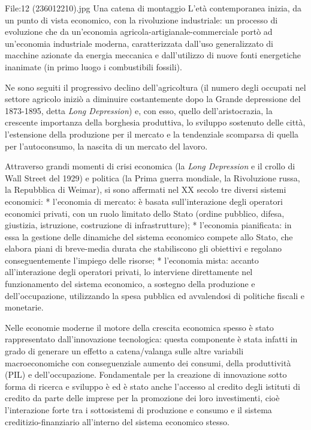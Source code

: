 File:12 (236012210).jpg Una catena di montaggio
L'età contemporanea inizia, da un punto di vista 
economico, con la rivoluzione industriale: un processo di evoluzione che da 
un'economia 
agricola-artigianale-commerciale 
portò ad un'economia industriale moderna, caratterizzata dall'uso 
generalizzato di macchine azionate da energia meccanica e 
dall'utilizzo di nuove fonti energetiche inanimate (in 
primo luogo i combustibili fossili).

Ne sono seguiti il progressivo declino dell'agricoltura (il numero degli 
occupati nel settore agricolo iniziò a diminuire costantemente dopo la Grande 
depressione del 1873-1895, detta \emph{Long Depression}) e, con esso, quello 
dell'aristocrazia, la crescente importanza della borghesia produttiva, lo 
sviluppo sostenuto delle città, l'estensione della produzione per il mercato e 
la tendenziale scomparsa di quella per l'autoconsumo, la nascita di un mercato 
del lavoro.

Attraverso grandi momenti di crisi economica (la \emph{Long Depression} e il 
crollo di Wall Street del 1929) e politica (la 
Prima guerra mondiale, la Rivoluzione russa, la Repubblica di 
Weimar), si sono affermati nel XX secolo tre diversi sistemi economici:
* l'economia di mercato: è basata sull'interazione degli operatori 
economici privati, con un ruolo limitato dello Stato (ordine pubblico, 
difesa, giustizia, istruzione, costruzione di infrastrutture);
* l'economia pianificata: in essa la gestione delle dinamiche del sistema 
economico compete allo Stato, che elabora piani di breve-media durata che 
stabiliscono gli obiettivi e regolano conseguentemente l'impiego delle risorse;
* l'economia mista: accanto all'interazione degli operatori privati, lo 
interviene direttamente nel 
funzionamento del sistema economico, a sostegno della produzione e 
dell'occupazione, utilizzando la spesa pubblica ed 
avvalendosi di politiche fiscali e monetarie.

Nelle economie moderne il motore della crescita economica spesso è stato 
rappresentato dall'innovazione 
tecnologica: questa componente è stata infatti in grado di generare un 
effetto a catena/valanga sulle altre variabili 
macroeconomiche con conseguenziale aumento dei 
consumi, della produttività (PIL) e dell'occupazione. 
Fondamentale per la creazione di innovazione sotto forma di ricerca e 
sviluppo è ed è stato anche l'accesso al credito degli istituti di 
credito da parte delle imprese per la promozione dei loro 
investimenti, cioè l'interazione forte tra i sottosistemi di 
produzione e consumo e il sistema creditizio-finanziario all'interno del 
sistema economico stesso.


